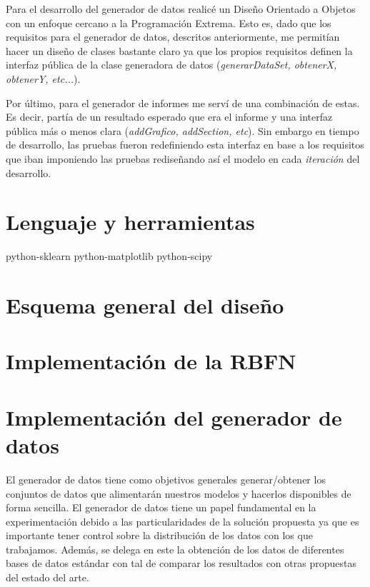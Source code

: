 \documentclass[10pt,a4paper]{report}
\begin{document}
Para el desarrollo del generador de datos realicé un Diseño Orientado a Objetos con un enfoque cercano a la Programación Extrema. Esto es, dado que los requisitos para el generador de datos, descritos anteriormente, me permitían hacer un diseño de clases bastante claro ya que los propios requisitos definen la interfaz pública de la clase generadora de datos (\textit{generarDataSet, obtenerX, obtenerY, etc...}).

Por último, para el generador de informes me serví de una combinación de estas. Es decir, partía de un resultado esperado que era el informe y una interfaz pública más o menos clara (\textit{addGrafico, addSection, etc}). Sin embargo en tiempo de desarrollo, las pruebas fueron redefiniendo esta interfaz en base a los requisitos que iban imponiendo las pruebas rediseñando así el modelo en cada \textit{iteración} del desarrollo.

\section{Lenguaje y herramientas}
python-sklearn python-matplotlib python-scipy
\section{Esquema general del diseño}
\section{Implementación de la RBFN}
\section{Implementación del generador de datos}
El generador de datos tiene como objetivos generales generar/obtener los conjuntos de datos que alimentarán nuestros modelos y hacerlos disponibles de forma sencilla. El generador de datos tiene un papel fundamental en la experimentación debido a las particularidades de la solución propuesta ya que es importante tener control sobre la distribución de los datos con los que trabajamos. Además, se delega en este la obtención de los datos de diferentes bases de datos estándar con tal de comparar los resultados con otras propuestas del estado del arte.
\end{document}
